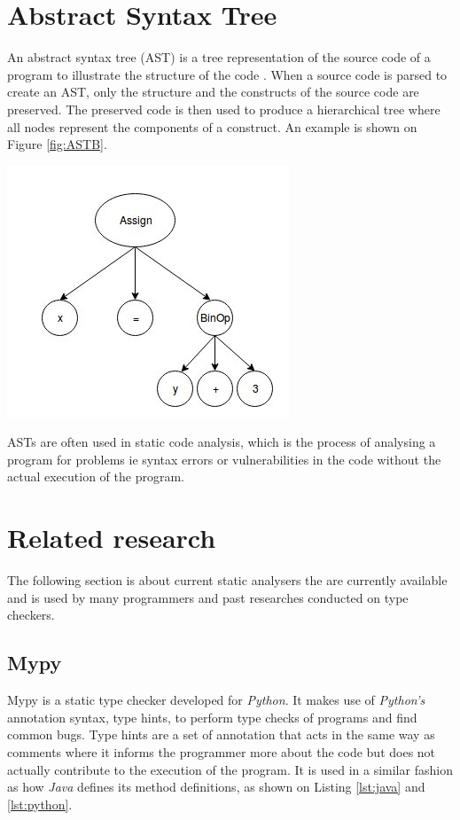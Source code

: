 \documentclass{l4proj}
\begin{document}
\section{Abstract Syntax Tree}
An abstract syntax tree (AST) is a tree representation of the source code of a program to illustrate the structure of the code \cite{ast}. When a source code is parsed to create an AST, only the structure and the constructs of the source code are preserved. The preserved code is then used to produce a hierarchical tree where all nodes represent the components of a construct. An example is shown on Figure \ref{fig:ASTB}.

\begin{center}
    \includegraphics{images/ASTB.png}
    \label{fig:ASTB}
\end{center}

ASTs are often used in static code analysis, which is the process of analysing a program for problems ie syntax errors or vulnerabilities in the code without the actual execution of the program.

\section{Related research}
The following section is about current static analysers the are currently available and is used by many programmers and past researches conducted on type checkers.

\subsection{Mypy}
\label{sec:mypy}
Mypy  \cite{mypy} is a static type checker developed for \emph{Python}. It makes use of \emph{Python's} annotation syntax, type hints, to perform type checks of programs and find common bugs. Type hints are a set of annotation that acts in the same way as comments where it informs the programmer more about the code but does not actually contribute to the execution of the program. It is used in a similar fashion as how \emph{Java} defines its method definitions, as shown on Listing \ref{lst:java} and \ref{lst:python}. 
\end{document}
